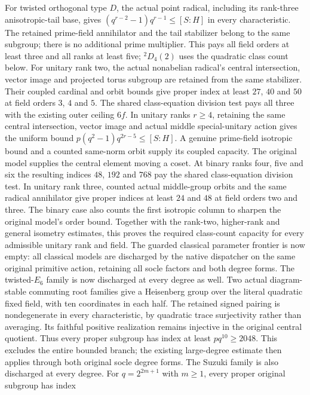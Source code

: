 For twisted orthogonal type $D$, the actual point radical, including its
rank-three anisotropic-tail base, gives
$(q^{r-2}-1)q^{r-1}\leq[S:H]$ in every characteristic. The retained
prime-field annihilator and the tail stabilizer belong to the same subgroup;
there is no additional prime multiplier. This pays all field orders at
least three and all ranks at least five; ${}^2D_4(2)$ uses the quadratic
class count below.
For unitary rank two, the actual nonabelian radical's central intersection,
vector image and projected torus subgroup are retained from the same
stabilizer. Their coupled cardinal and orbit bounds give proper index at
least $27$, $40$ and $50$ at field orders $3$, $4$ and $5$. The shared
class-equation division test pays all three with the existing outer
ceiling $6f$.
In unitary ranks $r\geq4$, retaining the same central intersection,
vector image and actual middle special-unitary action gives the uniform
bound $p(q^2-1)q^{2r-5}\leq[S:H]$. A genuine prime-field isotropic
bound and a counted same-norm orbit supply its coupled capacity.
The original model supplies the central element moving a coset.
At binary ranks four, five and six the resulting indices $48$, $192$
and $768$ pay the shared class-equation division test.
In unitary rank three, counted actual middle-group orbits and the same
radical annihilator give proper indices at least $24$ and $48$ at field
orders two and three. The binary case also counts the first isotropic
column to sharpen the original model's order bound. Together with the
rank-two, higher-rank and general isometry estimates, this proves the
required class-count capacity for every admissible unitary rank and field.
The guarded classical parameter frontier is now empty: all classical
models are discharged by the native dispatcher on the same original
primitive action, retaining all socle factors and both degree forms.
The twisted-$E_6$ family is now discharged at every degree as well.
Two actual diagram-stable commuting root families give a Heisenberg
group over the literal quadratic fixed field, with ten coordinates in
each half. The retained signed pairing is nondegenerate in every
characteristic, by quadratic trace surjectivity rather than averaging.
Its faithful positive realization remains injective in the original
central quotient. Thus every proper subgroup has index at least
$pq^{10}\geq2048$. This excludes the entire bounded branch; the existing
large-degree estimate then applies through both original socle degree
forms.
The Suzuki family is also discharged at every degree. For
$q=2^{2m+1}$ with $m\geq1$, every proper original subgroup has index
